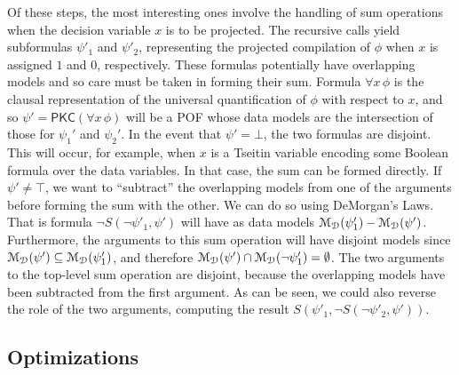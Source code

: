 \documentclass[letterpaper,USenglish,cleveref, autoref, thm-restate]{lipics-v2021}
\newcommand{\tautology}{\top}
\newcommand{\nil}{\bot}
\newcommand{\dmodelset}{{\cal M_{D}}}
\newcommand{\ureduce}[2]{\forall #2\, #1}
\newcommand{\algo}[1]{\textsf{#1}}
\newcommand{\pkc}{\algo{PKC}}
\begin{document}
Of these steps, the most interesting ones involve the handling of sum
operations when the decision variable $x$ is to be projected.  The
recursive calls yield subformulas $\psi'_1$ and $\psi'_2$, representing the projected compilation of $\phi$ when $x$ is assigned $1$ and $0$, respectively.
These
formulas potentially have overlapping models and so care must be taken
in forming their sum.  Formula $\ureduce{\phi}{x}$ is the clausal
representation of the universal quantification of $\phi$ with respect
to $x$, and so $\psi' = \pkc(\ureduce{\phi}{x})$ will be a POF whose
data models are the intersection of those for $\psi_1'$ and $\psi_2'$.  In
the event that $\psi' = \nil$, the two formulas are disjoint.  This
will occur, for example, when $x$ is a Tseitin variable encoding some
Boolean formula over the data variables.  In that case, the sum can be
formed directly.  If $\psi' \not = \tautology$, we want to
``subtract'' the overlapping models from one of the arguments before
forming the sum with the other.  We can do so using DeMorgan's Laws.  
That is formula $\neg S(\neg \psi'_1, \psi')$ will have as data models $\dmodelset(\psi'_1) - \dmodelset(\psi')$.  Furthermore, the arguments to this sum operation will have disjoint models
since $\dmodelset(\psi') \subseteq \dmodelset(\psi'_1)$, and therefore
$\dmodelset(\psi') \cap \dmodelset(\neg \psi'_1) = \emptyset$.
The two arguments to the top-level sum operation are disjoint, because the overlapping models have been subtracted from the first argument.
As can be seen, we could also reverse the role of the two arguments, computing the result
$S(\psi'_1, \neg S(\neg \psi'_2, \psi'))$.


\subsection{Optimizations}
\end{document}
